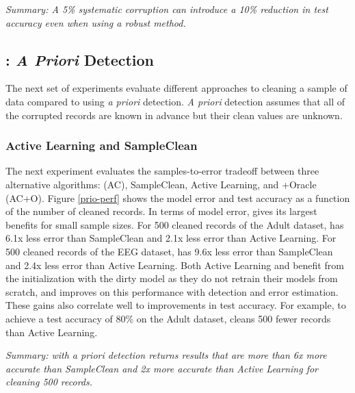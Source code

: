 \vspace{0.25em}

\noindent \emph{Summary: A 5\% systematic corruption can introduce a 10\% reduction in test accuracy even when using a robust method.}

\subsection{\sys: \emph{A Priori} Detection}
The next set of experiments evaluate different approaches to cleaning a sample of data compared to \sys using \emph{a priori} detection.
\emph{A priori} detection assumes that all of the corrupted records are known in advance but their clean values are unknown. 

\subsubsection{Active Learning and SampleClean}
The next experiment evaluates the samples-to-error tradeoff between three alternative algorithms: \sys (AC), SampleClean, Active Learning, and \sys+Oracle (AC+O).
Figure \ref{prio-perf} shows the model error and test accuracy as a function of the number of cleaned records.
In terms of model error, \sys gives its largest benefits for small sample sizes.
For 500 cleaned records of the Adult dataset, \sys has 6.1x less error than SampleClean and 2.1x less error than Active Learning.
For 500 cleaned records of the EEG dataset, \sys has 9.6x less error than SampleClean and 2.4x less error than Active Learning.
Both Active Learning and \sys benefit from the initialization with the dirty model as they do not retrain their models from scratch, and \sys improves on this performance with detection and error estimation.
These gains also correlate well to improvements in test accuracy.
For example, to achieve a test accuracy of 80\% on the Adult dataset, \sys cleans 500 fewer records than Active Learning.


\vspace{0.25em}

\noindent \emph{Summary: \sys with a priori detection returns results that are more than 6x more accurate than SampleClean and 2x more accurate than Active Learning for cleaning 500 records.}


